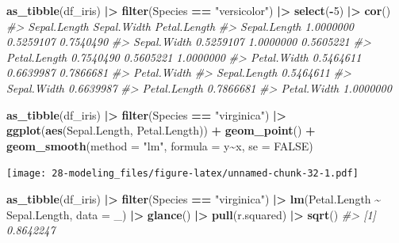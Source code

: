 \documentclass[
  xelatex, ja=standard]{bxjsbook}
\newenvironment{Shaded}{\begin{snugshade}}{\end{snugshade}}
\newcommand{\AttributeTok}[1]{\textcolor[rgb]{0.13,0.29,0.53}{#1}}
\newcommand{\CommentTok}[1]{\textcolor[rgb]{0.56,0.35,0.01}{\textit{#1}}}
\newcommand{\ConstantTok}[1]{\textcolor[rgb]{0.56,0.35,0.01}{#1}}
\newcommand{\DecValTok}[1]{\textcolor[rgb]{0.00,0.00,0.81}{#1}}
\newcommand{\FunctionTok}[1]{\textcolor[rgb]{0.13,0.29,0.53}{\textbf{#1}}}
\newcommand{\NormalTok}[1]{#1}
\newcommand{\SpecialCharTok}[1]{\textcolor[rgb]{0.81,0.36,0.00}{\textbf{#1}}}
\newcommand{\StringTok}[1]{\textcolor[rgb]{0.31,0.60,0.02}{#1}}
\theoremstyle{definition}
\theoremstyle{definition}
\theoremstyle{definition}
\theoremstyle{definition}
\theoremstyle{remark}
\begin{document}
\begin{Shaded}
\begin{Highlighting}[]
\FunctionTok{as\_tibble}\NormalTok{(df\_iris) }\SpecialCharTok{|\textgreater{}} \FunctionTok{filter}\NormalTok{(Species }\SpecialCharTok{==} \StringTok{"versicolor"}\NormalTok{) }\SpecialCharTok{|\textgreater{}} \FunctionTok{select}\NormalTok{(}\SpecialCharTok{{-}}\DecValTok{5}\NormalTok{) }\SpecialCharTok{|\textgreater{}} \FunctionTok{cor}\NormalTok{()}
\CommentTok{\#\textgreater{}              Sepal.Length Sepal.Width Petal.Length}
\CommentTok{\#\textgreater{} Sepal.Length    1.0000000   0.5259107    0.7540490}
\CommentTok{\#\textgreater{} Sepal.Width     0.5259107   1.0000000    0.5605221}
\CommentTok{\#\textgreater{} Petal.Length    0.7540490   0.5605221    1.0000000}
\CommentTok{\#\textgreater{} Petal.Width     0.5464611   0.6639987    0.7866681}
\CommentTok{\#\textgreater{}              Petal.Width}
\CommentTok{\#\textgreater{} Sepal.Length   0.5464611}
\CommentTok{\#\textgreater{} Sepal.Width    0.6639987}
\CommentTok{\#\textgreater{} Petal.Length   0.7866681}
\CommentTok{\#\textgreater{} Petal.Width    1.0000000}
\end{Highlighting}
\end{Shaded}

\begin{Shaded}
\begin{Highlighting}[]
\FunctionTok{as\_tibble}\NormalTok{(df\_iris) }\SpecialCharTok{|\textgreater{}} \FunctionTok{filter}\NormalTok{(Species }\SpecialCharTok{==} \StringTok{"virginica"}\NormalTok{) }\SpecialCharTok{|\textgreater{}} \FunctionTok{ggplot}\NormalTok{(}\FunctionTok{aes}\NormalTok{(Sepal.Length, Petal.Length)) }\SpecialCharTok{+} \FunctionTok{geom\_point}\NormalTok{() }\SpecialCharTok{+} \FunctionTok{geom\_smooth}\NormalTok{(}\AttributeTok{method =} \StringTok{"lm"}\NormalTok{, }\AttributeTok{formula =}\NormalTok{ y}\SpecialCharTok{\textasciitilde{}}\NormalTok{x, }\AttributeTok{se =} \ConstantTok{FALSE}\NormalTok{)}
\end{Highlighting}
\end{Shaded}

\texttt{[image: 28-modeling\_files/figure-latex/unnamed-chunk-32-1.pdf]}

\begin{Shaded}
\begin{Highlighting}[]
\FunctionTok{as\_tibble}\NormalTok{(df\_iris) }\SpecialCharTok{|\textgreater{}} \FunctionTok{filter}\NormalTok{(Species }\SpecialCharTok{==} \StringTok{"virginica"}\NormalTok{) }\SpecialCharTok{|\textgreater{}} \FunctionTok{lm}\NormalTok{(Petal.Length }\SpecialCharTok{\textasciitilde{}}\NormalTok{ Sepal.Length, }\AttributeTok{data =}\NormalTok{ \_) }\SpecialCharTok{|\textgreater{}} \FunctionTok{glance}\NormalTok{() }\SpecialCharTok{|\textgreater{}} \FunctionTok{pull}\NormalTok{(r.squared) }\SpecialCharTok{|\textgreater{}} \FunctionTok{sqrt}\NormalTok{()}
\CommentTok{\#\textgreater{} [1] 0.8642247}
\end{Highlighting}
\end{Shaded}
\end{document}
